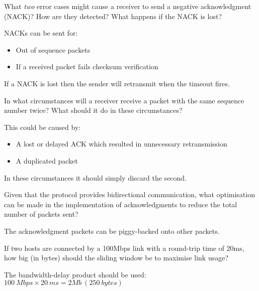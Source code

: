 \documentclass{supervision}
\begin{document}
\begin{questions}
\begin{parts}
\begin{subparts}
            \subpart What \emph{two} error cases might cause a receiver to send
              a negative acknowledgment (NACK)? How are they detected? What
              happens if the NACK is lost?
              \begin{solution}
                NACKs can be sent for:
                \begin{itemize}
                  \item Out of sequence packets
                  \item If a received packet fails checksum verification
                \end{itemize}

                If a NACK is lost then the sender will retransmit when the
                timeout fires.
              \end{solution}

            \subpart In what circumstances will a receiver receive a packet
              with the same sequence number twice? What should it do in these
              circumstances?
              \begin{solution}
                This could be caused by:
                \begin{itemize}
                  \item A lost or delayed ACK which resulted in unnecessary
                    retransmission
                  \item A duplicated packet
                \end{itemize}
                In these circumstances it should simply discard the second.
              \end{solution}

            \subpart Given that the protocol provides bidirectional
              communication, what optimisation can be made in the
              implementation of acknowledgments to reduce the total number of
              packets sent?
              \begin{solution}
                The acknowledgment packets can be piggy-backed onto other
                packets.
              \end{solution}

            \subpart If two hosts are connected by a 100Mbps link with a
              round-trip time of 20ms, how big (in bytes) should the sliding
              window be to maximise link usage?
              \begin{solution}
                The bandwidth-delay product should be used:
                $\SI{100}{Mbps} \times \SI{20}{ms} = 2Mb \: (\SI{250}{bytes})$
              \end{solution}


\end{subparts}
\end{parts}
\end{questions}
\end{document}
